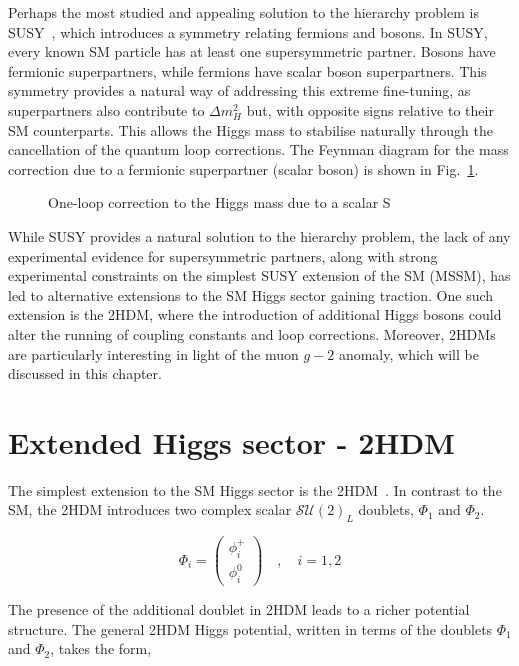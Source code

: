 Perhaps the most studied and appealing solution to the hierarchy problem is \ac{SUSY}~\cite{SUSY}, which introduces a symmetry relating fermions and bosons. In SUSY, every known SM particle has at least one supersymmetric partner. Bosons have fermionic superpartners, while fermions have scalar boson superpartners. This symmetry provides a natural way of addressing this extreme fine-tuning, as superpartners also contribute to $\Delta m_H^2$ but, with opposite signs relative to their SM counterparts. This allows the Higgs mass to stabilise naturally through the cancellation of the quantum loop corrections. The Feynman diagram for the mass correction due to a fermionic superpartner (scalar boson) is shown in Fig.~\ref{Figure:Chapter2_Hierarchy_Feynman2}.

\begin{figure}[h]
\centering

\caption{One-loop correction to the Higgs mass due to a scalar S}
\label{Figure:Chapter2_Hierarchy_Feynman2}
\end{figure}

While SUSY provides a natural solution to the hierarchy problem, the lack of any experimental evidence for supersymmetric partners, along with strong experimental constraints on the simplest SUSY extension of the SM (MSSM), has led to alternative extensions to the SM Higgs sector gaining traction. One such extension is the \ac{2HDM}, where the introduction of additional Higgs bosons could alter the running of coupling constants and loop corrections. Moreover, 2HDMs are particularly interesting in light of the muon $g-2$ anomaly, which will be discussed in this chapter.

\section{Extended Higgs sector - 2HDM}
\label{Section:Chapter2_2HDM}
The simplest extension to the SM Higgs sector is the 2HDM~\cite{2HDM_1}. In contrast to the SM, the 2HDM introduces two complex scalar $\mathcal{SU(2)}_L$ doublets, $\Phi_1$ and $\Phi_2$.

\begin{equation}
\Phi_i =
\begin{pmatrix}
\phi_i^{+} \\
\phi_i^{0} 
\end{pmatrix}
\quad ,\quad i = 1,2
\end{equation}

The presence of the additional doublet in 2HDM leads to a richer potential structure. The general 2HDM Higgs potential, written in terms of the doublets $\Phi_1$ and $\Phi_2$, takes the form,


